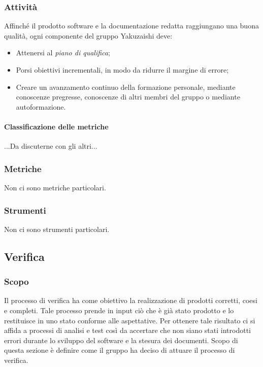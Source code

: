 \subsubsection{Attività}
Affinché il prodotto software e la documentazione redatta raggiungano una buona qualità, ogni componente del gruppo Yakuzaishi deve:
\begin{itemize}
    \item Attenersi al \textit{piano di qualifica};
    \item Porsi obiettivi incrementali, in modo da ridurre il margine di errore;
    \item Creare un avanzamento continuo della formazione personale, mediante conoscenze pregresse, conoscenze di altri membri del gruppo o mediante autoformazione. 
 \end {itemize}   
\paragraph{Classificazione delle metriche}
...Da discuterne con gli altri...
\subsubsection{Metriche}
Non ci sono metriche particolari.
\subsubsection{Strumenti}
Non ci sono strumenti particolari.

\pagebreak

\subsection{Verifica} \label{subsection: Verifica}
    \subsubsection{Scopo}
    Il processo di verifica ha come obiettivo la realizzazione di prodotti corretti, coesi e completi. Tale processo prende in input ciò che è già stato prodotto e lo restituisce in uno stato conforme alle aspettative. Per ottenere tale risultato ci si affida a processi di analisi e test così da accertare che non siano stati introdotti errori durante lo sviluppo del software e la stesura dei documenti. Scopo di questa sezione è definire come il gruppo ha deciso di attuare il processo di verifica.

